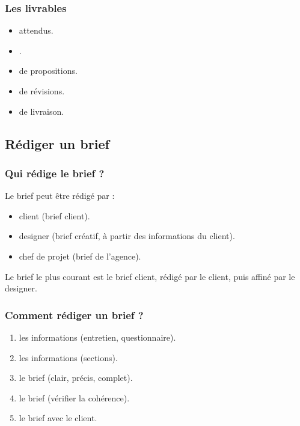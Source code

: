 \subsubsection{Les livrables}

\begin{itemize}
    \item {} attendus.
    \item {}.
    \item {} de propositions.
    \item {} de révisions.
    \item {} de livraison.
\end{itemize}

\subsection{Rédiger un brief}

\subsubsection{Qui rédige le brief ?}

Le brief peut être rédigé par :

\begin{itemize}
    \item {} client (brief client).
    \item {} designer (brief créatif, à partir des informations du client).
    \item {} chef de projet (brief de l'agence).
\end{itemize}

Le brief le plus courant est le brief client, rédigé par le client, puis affiné par le designer.

\subsubsection{Comment rédiger un brief ?}

\begin{enumerate}
    \item {} les informations (entretien, questionnaire).
    \item {} les informations (sections).
    \item {} le brief (clair, précis, complet).
    \item {} le brief (vérifier la cohérence).
    \item {} le brief avec le client.
\end{enumerate}

